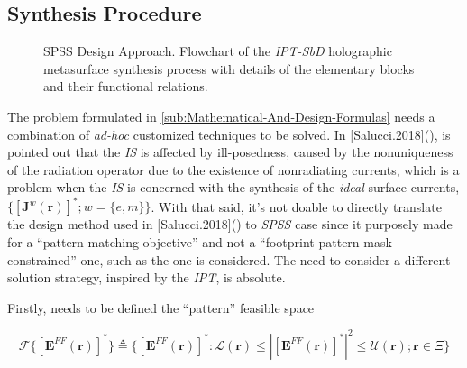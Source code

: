 \subsection{Synthesis Procedure \label{sub:Synthesis-Procedure}}

%
\begin{figure}[H]


\caption{\footnotesize\label{cap:Design}SPSS Design Approach. Flowchart of the \emph{IPT-SbD}
holographic metasurface synthesis process with details of the elementary
blocks and their functional relations.}
\end{figure}


The problem formulated in \ref{sub:Mathematical-And-Design-Formulas}
needs a combination of \emph{ad-hoc} customized techniques to be solved.
In {[}Salucci.2018{]}(\cite{Salucci:2018}), is pointed out that the
\emph{IS} is affected by ill-posedness, caused by the nonuniqueness
of the radiation operator due to the existence of nonradiating currents,
which is a problem when the \emph{IS} is concerned with the synthesis
of the \emph{ideal} surface currents, $\{[\mathbf{J}^{w}(\mathbf{r})]^{*};w=\{ e,m\}\}$.
With that said, it's not doable to directly translate the design method
used in {[}Salucci.2018{]}(\cite{Salucci:2018}) to \emph{SPSS} case
since it purposely made for a {}``pattern matching objective'' and
not a {}``footprint pattern mask constrained'' one, such as the
one is considered. The need to consider a different solution strategy,
inspired by the \emph{IPT}, is absolute.

Firstly, needs to be defined the {}``pattern'' feasible space

\begin{equation}
\mathcal{F}\{[\mathbf{E}^{FF}(\mathbf{r})]^{*}\}\triangleq\{[\mathbf{E}^{FF}(\mathbf{r})]^{*}:\mathcal{L}(\mathbf{r})\leq|[\mathbf{E}^{FF}(\mathbf{r})]^{*}|^{2}\leq\mathcal{U}(\mathbf{r});\mathbf{r}\in\Xi\}\label{eq:18}\end{equation}


